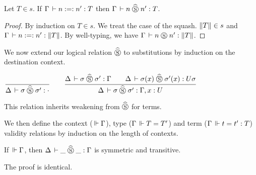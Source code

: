 \documentclass[a4paper,english]{lipics-utf8x}
\begin{document}
  \begin{lemma}
    Let $T \in s$.
    If $\Gamma \,\vdash n :=: n' : T$ then $\Gamma \,\vdash n \mathrel{\widehat{\mathrel{\circledS}}} n' : T$.
  \end{lemma}

  \begin{proof}
    By induction on $T \in s$. We treat the case of the squash.
    $\|T\| \in s$ and $\Gamma \,\vdash n :=: n' : \|T\|$.
    By well-typing, we have $\Gamma \,\vdash n \mathrel{\circledS} n' : \|T\|$.
  \end{proof}


  We now extend our logical relation $\mathrel{\widehat{\mathrel{\circledS}}}$ to substitutions by
  induction on the destination context.
  \begin{center}
  \(
    \ru{}{\Delta \der \sigma \hSr \sigma' : \cdot}
    \qquad
    \ru{\Delta \der \sigma \hSr \sigma' : \Gamma \qquad
        \Delta \der \sigma(x) \hSr \sigma'(x) : U \sigma
      }{\Delta \der \sigma \hSr \sigma' : \Gamma, x:U}
  \)
  \end{center}
  This relation inherits weakening from $\mathrel{\widehat{\mathrel{\circledS}}}$ for terms.

  We then define the context ($\,\Vdash \Gamma$), type ($\Gamma \,\Vdash T = T'$) and
  term ($\Gamma \,\Vdash t = t' : T$) validity relations by induction on the length
  of contexts.

  \begin{mathc}
    \ru{}{\Der \cdot}
    \qquad
    \qquad
    \qquad
  \end{mathc}

  \begin{mathc}
    \qquad
  \end{mathc}

  \begin{lemma}
    If $\,\Vdash \Gamma$, then $\Delta \,\vdash \_ \mathrel{\widehat{\mathrel{\circledS}}} \_ : \Gamma$ is symmetric and
    transitive.
  \end{lemma}
  The proof is identical.
\end{document}
